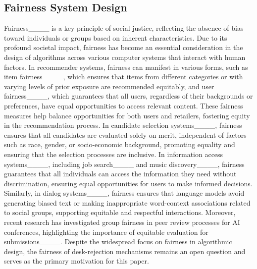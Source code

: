 \subsection{Fairness System Design}

Fairness____ is a key principle of social justice, reflecting the absence of bias toward individuals or groups based on inherent characteristics. Due to its profound societal impact, fairness has become an essential consideration in the design of algorithms across various computer systems that interact with human factors. In recommender systems, fairness can manifest in various forms, such as item fairness____, which ensures that items from different categories or with varying levels of prior exposure are recommended equitably, and user fairness____, which guarantees that all users, regardless of their backgrounds or preferences, have equal opportunities to access relevant content. These fairness measures help balance opportunities for both users and retailers, fostering equity in the recommendation process. In candidate selection systems____, fairness ensures that all candidates are evaluated solely on merit, independent of factors such as race, gender, or socio-economic background, promoting equality and ensuring that the selection processes are inclusive. In information access systems____, including job search____ and music discovery____, fairness guarantees that all individuals can access the information they need without discrimination, ensuring equal opportunities for users to make informed decisions. Similarly, in dialog systems____, fairness ensures that language models avoid generating biased text or making inappropriate word-context associations related to social groups, supporting equitable and respectful interactions. Moreover, recent research has investigated group fairness in peer review processes for AI conferences, highlighting the importance of equitable evaluation for submissions____.
Despite the widespread focus on fairness in algorithmic design, the fairness of desk-rejection mechanisms remains an open question and serves as the primary motivation for this paper.